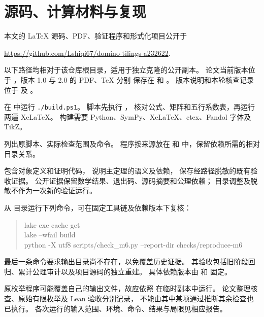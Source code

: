 \section{源码、计算材料与复现}\label{app:repro}

本文的 LaTeX 源码、PDF、验证程序和形式化项目公开于
\begin{center}
\url{https://github.com/Lshiqi67/domino-tilings-a232622}.
\end{center}
以下路径均相对于该仓库根目录，适用于独立克隆的公开副本。
论文当前版本位于 ，版本 1.0 与 2.0 的 PDF、TeX 分别
保存在  和 。
版本说明和本轮核查记录位于 
及 。

\begin{description}[style=nextline,leftmargin=2em]
\item[论文构建]
在  中运行 \texttt{./build.ps1}。
脚本先执行 ，
核对公式、矩阵和五行系数表，再运行两遍 XeLaTeX。
构建需要 Python、SymPy、XeLaTeX、ctex、Fandol 字体及 TikZ。
\item[基本块和半棋盘程序]
 列出原脚本、实际检查范围及命令。
程序按来源放在  和
 中，保留依赖所需的相对目录关系。
\item[形式化源码与证据]
 包含对象定义和证明代码，
 说明主定理的语义及依赖，
 保存经路径脱敏的既有验收证据。
公开证据保留数学结果、退出码、源码摘要和公理依赖；
目录调整及脱敏不作为一次新的验证运行。
\end{description}

从  目录运行下列命令，可在固定工具链及依赖版本下复核：
\begin{quote}\small\ttfamily
lake exe cache get\\
lake --wfail build\\
python -X utf8 scripts/check\_m6.py --report-dir checks/reproduce-m6
\end{quote}
最后一条命令要求输出目录尚不存在，以免覆盖历史证据。
其验收包括旧阶段回归、累计公理审计以及项目源码的独立重建。
具体依赖版本由  和
 固定。

原枚举程序可能覆盖自己的输出文件，故应依照
 在临时副本中运行。
论文整理核查、原始有限枚举及 Lean 验收分别记录，
不能由其中某项通过推断其余检查也已执行。
各次运行的输入范围、环境、命令、结果与局限见相应报告。
